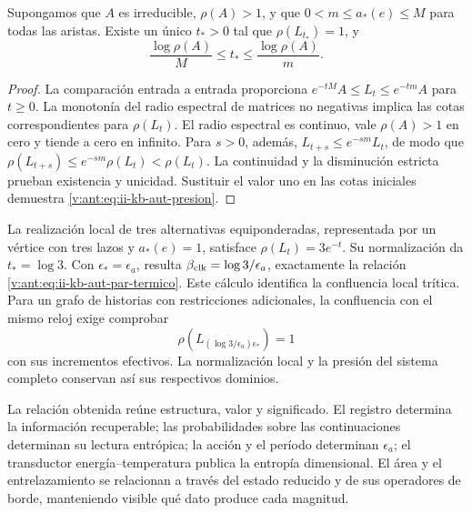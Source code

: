\begin{proposition}
Supongamos que \(A\) es irreducible, \(\rho(A)>1\), y que
\(0<m\leq a_*(e)\leq M\) para todas las aristas. Existe un único
\(t_*>0\) tal que \(\rho(L_{t_*})=1\), y
\begin{equation}
 \frac{\log\rho(A)}{M}\leq t_*\leq
 \frac{\log\rho(A)}{m}.
 \label{v:ant:eq:ii-kb-aut-presion}
\end{equation}
\end{proposition}
\begin{proof}
La comparación entrada a entrada proporciona
\(e^{-tM}A\leq L_t\leq e^{-tm}A\) para \(t\geq0\).
La monotonía del radio espectral de matrices no negativas implica
las cotas correspondientes para \(\rho(L_t)\). El radio espectral
es continuo, vale \(\rho(A)>1\) en cero y tiende a cero en infinito.
Para \(s>0\), además,
\(L_{t+s}\leq e^{-sm}L_t\), de modo que
\(\rho(L_{t+s})\leq e^{-sm}\rho(L_t)<\rho(L_t)\).
La continuidad y la disminución estricta prueban existencia y
unicidad. Sustituir el valor uno en las cotas iniciales demuestra
\eqref{v:ant:eq:ii-kb-aut-presion}.
\end{proof}

La realización local de tres alternativas equiponderadas, representada
por un vértice con tres lazos y \(a_*(e)=1\), satisface
\(\rho(L_t)=3e^{-t}\). Su normalización da \(t_*=\log3\).
Con \(\epsilon_*=\epsilon_a\), resulta
\(\beta_{\rm clk}=\log3/\epsilon_a\), exactamente la relación
\eqref{v:ant:eq:ii-kb-aut-par-termico}. Este cálculo identifica la
confluencia local trítica. Para un grafo de historias con restricciones
adicionales, la confluencia con el mismo reloj exige comprobar
\[
 \rho\!\left(L_{(\log3/\epsilon_a)\epsilon_*}\right)=1
\]
con sus incrementos efectivos. La normalización local y la presión
del sistema completo conservan así sus respectivos dominios.

La relación obtenida reúne estructura, valor y significado. El registro
determina la información recuperable; las probabilidades sobre las
continuaciones determinan su lectura entrópica; la acción y el período
determinan \(\epsilon_a\); el transductor energía--temperatura
publica la entropía dimensional. El área y el entrelazamiento se
relacionan a través del estado reducido y de sus operadores de borde,
manteniendo visible qué dato produce cada magnitud.
